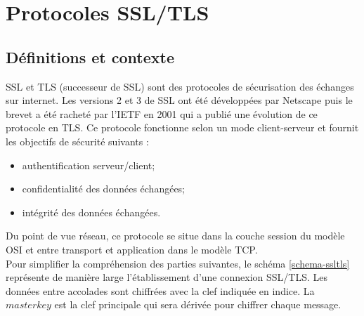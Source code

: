 \chapter{Protocoles SSL/TLS}

\section{Définitions et contexte}

SSL et TLS (successeur de SSL) sont des protocoles de sécurisation des échanges sur internet. Les versions 2 et 3 de SSL ont été développées par Netscape puis le brevet a été racheté par l'IETF en 2001 qui a publié une évolution de ce protocole en TLS. Ce protocole fonctionne selon un mode client-serveur et fournit les objectifs de sécurité suivants :
\begin{itemize}
\item authentification serveur/client;
\item confidentialité des données échangées;
\item intégrité des données échangées.\\
\end{itemize}

Du point de vue réseau, ce protocole se situe dans la couche session du modèle OSI et entre transport et application dans le modèle TCP.\\



Pour simplifier la compréhension des parties suivantes, le schéma \ref{schema-ssltls} représente de manière large l'établissement d'une connexion SSL/TLS. Les données entre accolades sont chiffrées avec la clef indiquée en indice. La $masterkey$ est la clef principale qui sera dérivée pour chiffrer chaque message.

